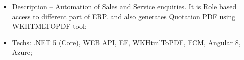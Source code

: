 \documentclass[10pt,a4paper]{altacv}
\begin{document}
\divider
%
\begin{itemize}
  \item Description -- Automation of Sales and Service enquiries. It is Role based access to different part of ERP. and also generates Quotation PDF using WKHTMLTOPDF tool;
  \item Techs: .NET 5 (Core), WEB API, EF, WKHtmlToPDF, FCM, Angular 8, Azure;
\end{itemize}

\end{document}
